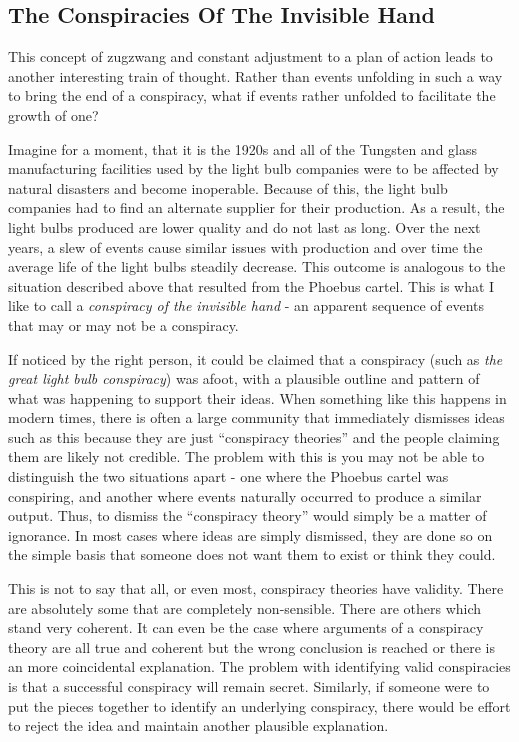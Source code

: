 \documentclass[10pt, a4paper, twocolumn]{book}
\begin{document}
\subsection{The Conspiracies Of The Invisible Hand}

This concept of zugzwang and constant adjustment to a plan of action leads to another interesting train of thought. Rather than events unfolding in such a way to bring the end of a conspiracy, what if events rather unfolded to facilitate the growth of one? 

Imagine for a moment, that it is the 1920s and all of the Tungsten and glass manufacturing facilities used by the light bulb companies were to be affected by natural disasters and become inoperable. Because of this, the light bulb companies had to find an alternate supplier for their production. As a result, the light bulbs produced are lower quality and do not last as long. Over the next years, a slew of events cause similar issues with production and over time the average life of the light bulbs steadily decrease. This outcome is analogous to the situation described above that resulted from the Phoebus cartel. This is what I like to call a \textit{conspiracy of the invisible hand} - an apparent sequence of events that may or may not be a conspiracy.

If noticed by the right person, it could be claimed that a conspiracy (such as \textit{the great light bulb conspiracy}) was afoot, with a plausible outline and pattern of what was happening to support their ideas. When something like this happens in modern times, there is often a large community that immediately dismisses ideas such as this because they are just ``conspiracy theories'' and the people claiming them are likely not credible. The problem with this is you may not be able to distinguish the two situations apart - one where the Phoebus cartel was conspiring, and another where events naturally occurred to produce a similar output. Thus, to dismiss the ``conspiracy theory'' would simply be a matter of ignorance. In most cases where ideas are simply dismissed, they are done so on the simple basis that someone does not want them to exist or think they could. 

This is not to say that all, or even most, conspiracy theories have validity. There are absolutely some that are completely non-sensible. There are others which stand very coherent. It can even be the case where arguments of a conspiracy theory are all true and coherent but the wrong conclusion is reached or there is an more coincidental explanation. The problem with identifying valid conspiracies is that a successful conspiracy will remain secret. Similarly, if someone were to put the pieces together to identify an underlying conspiracy, there would be effort to reject the idea and maintain another plausible explanation.
\end{document}
